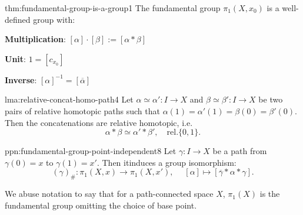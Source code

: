 \documentclass[landscape, 8pt]{extarticle}
\begin{document}
\begin{multicols*}{3}
\vspace{-7pt}
\begin{thm}{thm:fundamental-group-is-a-group}{1}
	\vspace{-2pt}
	The fundamental group $\pi_{1}(X, x_{0})$ is a well-defined group with:
	\begin{itemize-tight}
	    \item \textbf{Multiplication}: $[\alpha] \cdot [\beta] := [\alpha \ast \beta]$
			\begin{multicols}{2}
			\item \textbf{Unit}: $1 = [c_{x_{0}}]$
			\item \textbf{Inverse}: $[\alpha]^{-1} = [\overline{\alpha}]$
			\end{multicols}
	\end{itemize-tight}
\end{thm}

\vspace{-7pt}
\begin{lma}{lma:relative-concat-homo-path}{4}
	\vspace{-2pt}
	Let $\alpha \simeq \alpha' : I \to X$ and $\beta \simeq \beta' : I \to X$ be two pairs of relative homotopic paths such that $\alpha(1) = \alpha'(1) = \beta(0) = \beta'(0)$. Then the concatenations are relative homotopic, i.e.
	\vspace{-2pt}
	\[\alpha \ast \beta \simeq \alpha' \ast \beta', \quad \mathrm{rel. } \{0,1\}.\]
\end{lma}

\vspace{-7pt}
\begin{ppn}{ppn:fundamental-group-point-independent}{8}
	\vspace{-2pt}
	Let $\gamma : I \to X$ be a path from $\gamma(0) = x$ to $\gamma(1) = x'$. Then it\newline induces a group isomorphism:
	\[(\gamma)_{\#} : \pi_{1}(X, x) \to \pi_{1}(X, x'),\;\quad [\alpha] \mapsto [\overline{\gamma} \ast \alpha \ast \gamma].\]
	\par\vspace{-4pt}
	\tcbline
	We abuse notation to say that for a path-connected space $X$, $\pi_{1}(X)$ is the fundamental group omitting the choice of base point.
\end{ppn}


\end{multicols*}
\end{document}
